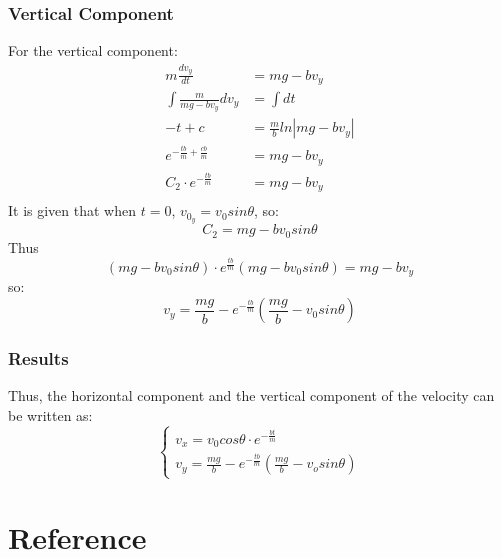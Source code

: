 \documentclass{article}
\begin{document}
        \subsubsection{Vertical Component}
        For the vertical component:
        \begin{equation}
            \begin{aligned}
                m\frac{dv_y}{dt} &= mg-bv_y\\
                \int \frac{m}{mg-bv_y}dv_y &= \int dt\\
                -t + c &= \frac{m}{b}ln|mg-bv_y| \\
                e^{-\frac{tb}{m} + \frac{cb}{m}} &= mg-bv_y\\
                C_2\cdot e^{-\frac{tb}{m}} &= mg-bv_y\\
            \end{aligned}
        \end{equation}
        It is given that when $t = 0$, $v_{0_y} = v_0sin\theta$, so:
        $$C_2 = mg-bv_0sin\theta$$
        Thus
        $$(mg-bv_0sin\theta)\cdot e^{\frac{tb}{m}}(mg-bv_0sin\theta) = mg-bv_y$$
        so:
        \begin{equation} \label{y_air}
            v_y = \frac{mg}{b}-e^{-\frac{tb}{m}}(\frac{mg}{b}-v_0sin\theta)
        \end{equation}
        \subsubsection{Results}
        Thus, the horizontal component and the vertical component of the velocity can be written as:
        \begin{equation*}
            \begin{cases}
            v_x = v_0cos\theta\cdot e^{-\frac{bt}{m}}\\
            v_y = \frac{mg}{b} - e^{-\frac{tb}{m}}(\frac{mg}{b}-v_osin\theta)
            \end{cases}
        \end{equation*}
        
        
\section{Reference}
\printbibliography
\end{document}
